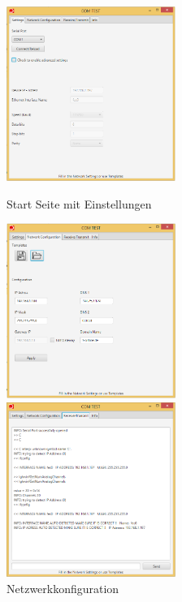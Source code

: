 \documentclass{article}
\begin{document}
		\begin{figure}
	
			\begin{varwidth}[t]{\linewidth}
				\includegraphics[width=0.49\textwidth]{Bilder/11.png}
				\caption{Start Seite mit Einstellungen}
				\label{fig40}	
			\end{varwidth} %
			\begin{varwidth}[t]{\linewidth}
				\includegraphics[width=0.49\textwidth]{Bilder/12.png}
				\caption{Netzwerkkonfiguration}
				\label{fig41}
			\end{varwidth}
			\begin{varwidth}[t]{\linewidth}
				\includegraphics[width=0.49\textwidth]{Bilder/13.png}

\end{varwidth}
\end{figure}
\end{document}
